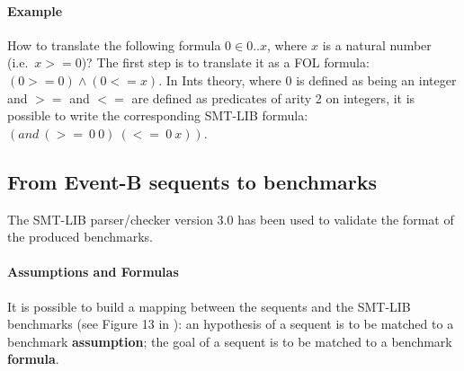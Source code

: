 \paragraph{Example}
How to translate the following formula $0 \in 0 .. x$, where $x$ is a natural number (i.e.\ $x >= 0$)? 
The first step is to translate it as a FOL formula: 
$(0 >= 0) \wedge (0 <= x)$. 
In Ints theory, where $0$ is defined as being an integer and $>=$ and $<=$ are defined as predicates of arity 2 on integers, it is possible to write the corresponding SMT-LIB formula: $(and~(>=~0~0)~(<=~0~x))$. 

\subsection{From Event-B sequents to benchmarks}
The SMT-LIB parser/checker version 3.0\cite{SMT-LIB} has been used to validate the format of the produced benchmarks.

\paragraph{Assumptions and Formulas}
It is possible to build a mapping between the sequents and the SMT-LIB benchmarks (see Figure 13 in \cite{SMTLIB06}): an hypothesis of a sequent is to be matched to a benchmark \textbf{assumption}; the goal of a sequent is to be matched to a benchmark \textbf{formula}. 

